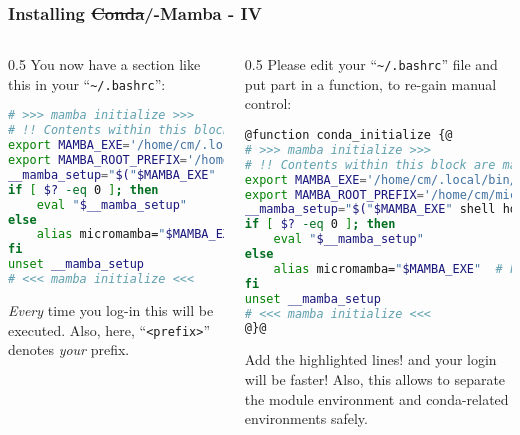 \begin{frame}[fragile]
  \frametitle{Installing \sout{Conda}/\textmu-Mamba - IV}
  \footnotesize
  \begin{columns}[t]
    \begin{column}{0.5\textwidth}
       You now have a section like this in your ``\texttt{\textasciitilde/.bashrc}'':
       \begin{lstlisting}[language=Bash, style=Shell, basicstyle=\tiny, breaklines=true]
# >>> mamba initialize >>>
# !! Contents within this block are managed by 'mamba init' !!
export MAMBA_EXE='/home/cm/.local/bin/micromamba';
export MAMBA_ROOT_PREFIX='/home/cm/micromamba';
__mamba_setup="$("$MAMBA_EXE" shell hook --shell bash --root-prefix "$MAMBA_ROOT_PREFIX" 2> /dev/null)"
if [ $? -eq 0 ]; then
    eval "$__mamba_setup"
else
    alias micromamba="$MAMBA_EXE"  # Fallback on help from mamba activate
fi
unset __mamba_setup
# <<< mamba initialize <<<
      \end{lstlisting}
      \bcattention \emph{Every} time you log-in this will be executed. Also, here, ``\texttt{<prefix>}'' denotes \emph{your} prefix.
    \end{column}
    \begin{column}{0.5\textwidth}
       \pause
       Please edit your ``\texttt{\textasciitilde/.bashrc}'' file and put part in a function, to re-gain manual control:
       \begin{lstlisting}[language=Bash, style=Shell, basicstyle=\tiny, breaklines=true]
@function conda_initialize {@
# >>> mamba initialize >>>
# !! Contents within this block are managed by 'mamba init' !!
export MAMBA_EXE='/home/cm/.local/bin/micromamba';
export MAMBA_ROOT_PREFIX='/home/cm/micromamba';
__mamba_setup="$("$MAMBA_EXE" shell hook --shell bash --root-prefix "$MAMBA_ROOT_PREFIX" 2> /dev/null)"
if [ $? -eq 0 ]; then
    eval "$__mamba_setup"
else
    alias micromamba="$MAMBA_EXE"  # Fallback on help from mamba activate
fi
unset __mamba_setup
# <<< mamba initialize <<<
@}@
      \end{lstlisting}
      \bcattention Add the highlighted lines! and your login will be faster! Also, this allows to separate the module environment and conda-related environments safely.
    \end{column}
  \end{columns}
\end{frame}

